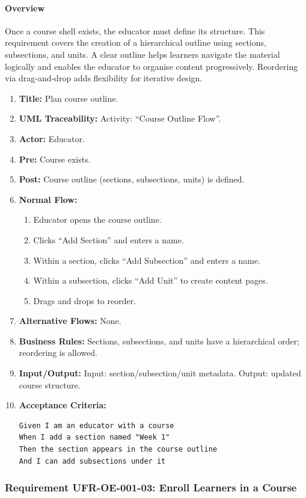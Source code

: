 \paragraph{Overview}
Once a course shell exists, the educator must define its structure. This requirement covers the creation of a hierarchical outline using sections, subsections, and units. A clear outline helps learners navigate the material logically and enables the educator to organise content progressively. Reordering via drag‑and‑drop adds flexibility for iterative design.
\begin{enumerate}[label=\textbf{\arabic*.}]
\item \textbf{Title:} Plan course outline.
\item \textbf{UML Traceability:} Activity: “Course Outline Flow”.
\item \textbf{Actor:} Educator.
\item \textbf{Pre:} Course exists.
\item \textbf{Post:} Course outline (sections, subsections, units) is defined.
\item \textbf{Normal Flow:} 
    \begin{enumerate}
        \item Educator opens the course outline.
        \item Clicks “Add Section” and enters a name.
        \item Within a section, clicks “Add Subsection” and enters a name.
        \item Within a subsection, clicks “Add Unit” to create content pages.
        \item Drags and drops to reorder.
    \end{enumerate}
\item \textbf{Alternative Flows:} None.
\item \textbf{Business Rules:} Sections, subsections, and units have a hierarchical order; reordering is allowed.
\item \textbf{Input/Output:} Input: section/subsection/unit metadata. Output: updated course structure.
\item \textbf{Acceptance Criteria:}
    \begin{verbatim}
Given I am an educator with a course
When I add a section named "Week 1"
Then the section appears in the course outline
And I can add subsections under it
    \end{verbatim}
\end{enumerate}

\subsubsection{Requirement UFR-OE-001-03: Enroll Learners in a Course}
